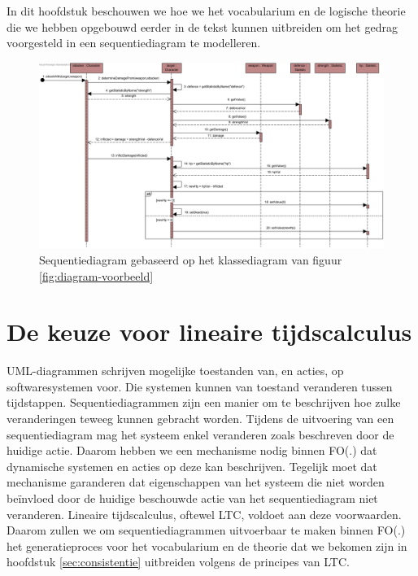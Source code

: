 In dit hoofdstuk beschouwen we hoe we het vocabularium en de logische theorie die we hebben opgebouwd eerder in de tekst kunnen uitbreiden om het gedrag voorgesteld in een sequentiediagram te modelleren.

\begin{landscape}
\begin{figure}
	\label{fig:seq-diagram-game}
	\includegraphics[width=1.5\textwidth]{chap-gedrag/seq-diagram-game.png}
	\caption{Sequentiediagram gebaseerd op het klassediagram van figuur \ref{fig:diagram-voorbeeld}}
\end{figure}
\end{landscape}

\section{De keuze voor lineaire tijdscalculus}
UML-diagrammen schrijven mogelijke toestanden van, en acties, op softwaresystemen voor. Die systemen kunnen van toestand veranderen tussen tijdstappen. Sequentiediagrammen zijn een manier om te beschrijven hoe zulke veranderingen teweeg kunnen gebracht worden. Tijdens de uitvoering van een sequentiediagram mag het systeem enkel veranderen zoals beschreven door de huidige actie. Daarom hebben we een mechanisme nodig binnen FO(.) dat dynamische systemen en acties op deze kan beschrijven. Tegelijk moet dat mechanisme garanderen dat eigenschappen van het systeem die niet worden be\"invloed door de huidige beschouwde actie van het sequentiediagram niet veranderen. Lineaire tijdscalculus\cite{BogaertsBart2014Sdsu}, oftewel LTC, voldoet aan deze voorwaarden. Daarom zullen we om sequentiediagrammen uitvoerbaar te maken binnen FO(.) het generatieproces voor het vocabularium en de theorie dat we bekomen zijn in hoofdstuk \ref{sec:consistentie} uitbreiden volgens de principes van LTC.

